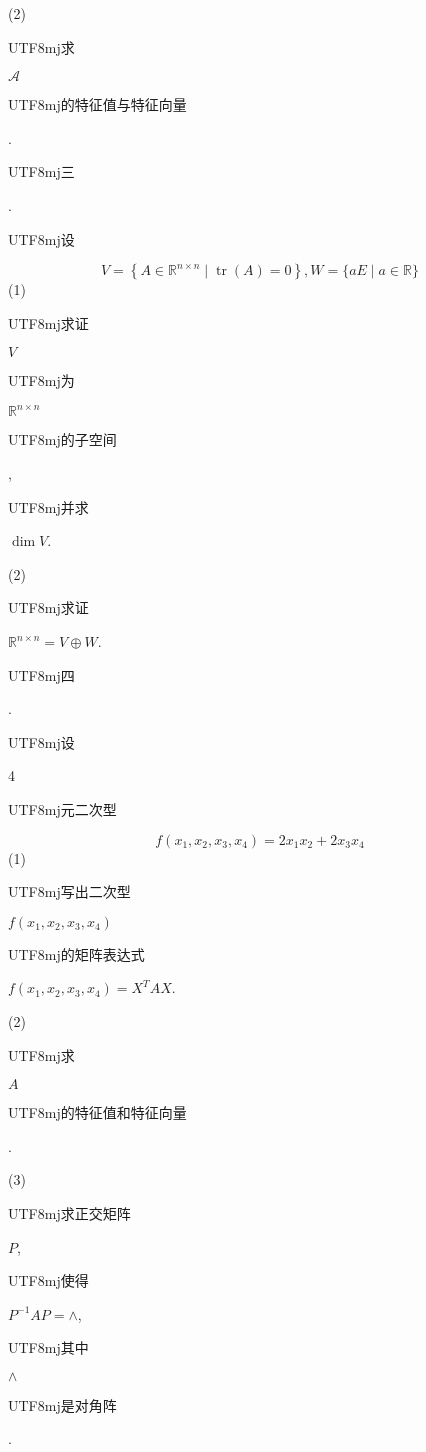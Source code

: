 \documentclass[10pt]{article}
\begin{document}
(2) \begin{CJK}{UTF8}{mj}求\end{CJK} $\mathscr{A}$ \begin{CJK}{UTF8}{mj}的特征值与特征向量\end{CJK}.

\begin{CJK}{UTF8}{mj}三\end{CJK}. \begin{CJK}{UTF8}{mj}设\end{CJK}
$$
V=\left\{A \in \mathbb{R}^{n \times n} \mid \operatorname{tr}(A)=0\right\}, W=\{a E \mid a \in \mathbb{R}\}
$$
(1) \begin{CJK}{UTF8}{mj}求证\end{CJK} $V$ \begin{CJK}{UTF8}{mj}为\end{CJK} $\mathbb{R}^{n \times n}$ \begin{CJK}{UTF8}{mj}的子空间\end{CJK}, \begin{CJK}{UTF8}{mj}并求\end{CJK} $\operatorname{dim} V$.

(2) \begin{CJK}{UTF8}{mj}求证\end{CJK} $\mathbb{R}^{n \times n}=V \oplus W$.

\begin{CJK}{UTF8}{mj}四\end{CJK}. \begin{CJK}{UTF8}{mj}设\end{CJK} 4 \begin{CJK}{UTF8}{mj}元二次型\end{CJK}
$$
f\left(x_{1}, x_{2}, x_{3}, x_{4}\right)=2 x_{1} x_{2}+2 x_{3} x_{4}
$$
(1) \begin{CJK}{UTF8}{mj}写出二次型\end{CJK} $f\left(x_{1}, x_{2}, x_{3}, x_{4}\right)$ \begin{CJK}{UTF8}{mj}的矩阵表达式\end{CJK} $f\left(x_{1}, x_{2}, x_{3}, x_{4}\right)=X^{T} A X$.

(2) \begin{CJK}{UTF8}{mj}求\end{CJK} $A$ \begin{CJK}{UTF8}{mj}的特征值和特征向量\end{CJK}.

(3) \begin{CJK}{UTF8}{mj}求正交矩阵\end{CJK} $P$, \begin{CJK}{UTF8}{mj}使得\end{CJK} $P^{-1} A P=\wedge$, \begin{CJK}{UTF8}{mj}其中\end{CJK} $\wedge$ \begin{CJK}{UTF8}{mj}是对角阵\end{CJK}.
\end{document}
